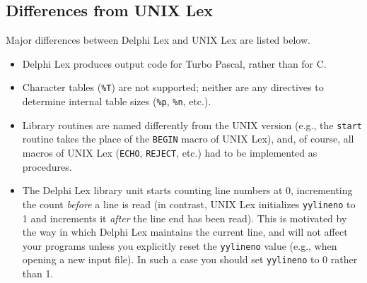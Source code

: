 \documentclass{article}
\begin{document}
\subsection{Differences from UNIX Lex}

Major differences between Delphi Lex and UNIX Lex are listed below.

\begin{itemize}
   \item
      Delphi Lex produces output code for Turbo Pascal, rather than for C.
   \item
      Character tables (\verb"%T") are not supported; neither are any
      directives to determine internal table sizes (\verb"%p", \verb"%n",
      etc.).
   \item
      Library routines are named differently from the UNIX version (e.g.,
      the \verb"start" routine takes the place of the \verb"BEGIN" macro of
      UNIX Lex), and, of course, all macros of UNIX Lex (\verb"ECHO",
      \verb"REJECT", etc.) had to be implemented as procedures.
    \item
      The Delphi Lex library unit starts counting line numbers at 0, incrementing
      the count {\em before\/} a line is read (in contrast, UNIX Lex
      initializes \verb"yylineno" to 1 and increments it {\em after\/} the
      line end has been read). This is motivated by the way in which Delphi Lex
      maintains the current line, and will not affect your programs unless you
      explicitly reset the \verb"yylineno" value (e.g., when opening a new
      input file). In such a case you should set \verb"yylineno" to 0 rather
      than 1.
\end{itemize}
\end{document}

